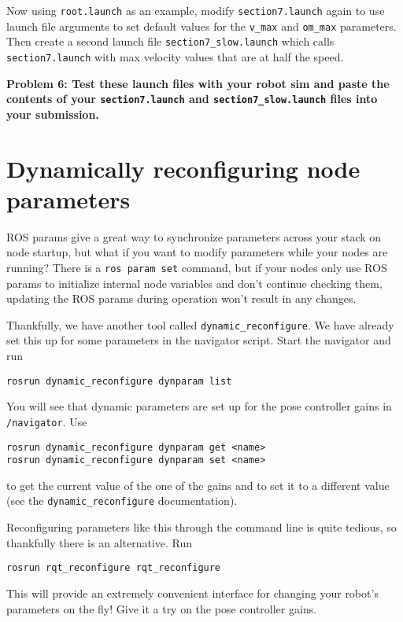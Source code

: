 \documentclass{article}
\begin{document}
Now using \texttt{root.launch} as an example, modify \texttt{section7.launch} again to use launch file arguments to set default values for the \texttt{v\_max} and \texttt{om\_max} parameters. Then create a second launch file \texttt{section7\_slow.launch} which calls \texttt{section7.launch} with max velocity values that are at half the speed.

{\bf Problem 6: Test these launch files with your robot sim and paste the contents of your \texttt{section7.launch} and \texttt{section7\_slow.launch} files into your submission.}

\section{Dynamically reconfiguring node parameters}
ROS params give a great way to synchronize parameters across your stack on node startup, but what if you want to modify parameters while your nodes are running? There is a \texttt{ros param set} command, but if your nodes only use ROS params to initialize internal node variables and don't continue checking them, updating the ROS params during operation won't result in any changes.

Thankfully, we have another tool called \texttt{dynamic\_reconfigure}. We have already set this up for some parameters in the navigator script. Start the navigator and run
\begin{lstlisting}
rosrun dynamic_reconfigure dynparam list
\end{lstlisting}

You will see that dynamic parameters are set up for the pose controller gains in \texttt{/navigator}. Use 
\begin{lstlisting}
rosrun dynamic_reconfigure dynparam get <name>
rosrun dynamic_reconfigure dynparam set <name>
\end{lstlisting}

to get the current value of the one of the gains and to set it to a different value (see the \texttt{dynamic\_reconfigure} documentation).

Reconfiguring parameters like this through the command line is quite tedious, so thankfully there is an alternative. Run
\begin{lstlisting}
rosrun rqt_reconfigure rqt_reconfigure
\end{lstlisting}

This will provide an extremely convenient interface for changing your robot's parameters on the fly! Give it a try on the pose controller gains.
\end{document}
